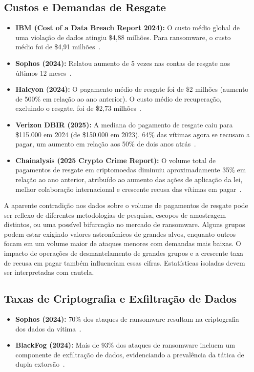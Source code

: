 \subsection{Custos e Demandas de Resgate}
\begin{itemize}
    \item \textbf{IBM (Cost of a Data Breach Report 2024):} O custo médio global de uma violação de dados 
    atingiu \$4,88 milhões. Para ransomware, o custo médio foi de \$4,91 milhões~\cite{}.
    \item \textbf{Sophos (2024):} Relatou aumento de 5 vezes nas contas de resgate nos últimos 12 meses~\cite{SophosStateOfRansomware2024}.
    \item \textbf{Halcyon (2024):} O pagamento médio de resgate foi de \$2 milhões (aumento de 500\% em relação ao ano anterior). O custo médio de recuperação, excluindo o resgate, foi de \$2,73 milhões~\cite{HalcyonFinancialImpactRansomware}.
    \item \textbf{Verizon DBIR (2025):} A mediana do pagamento de resgate caiu para \$115.000 em 2024 (de \$150.000 em 2023). 64\% das vítimas agora se recusam a pagar, um aumento em relação aos 50\% de dois anos atrás~\cite{VerizonDBIR2025}.
    \item \textbf{Chainalysis (2025 Crypto Crime Report):} O volume total de pagamentos de resgate em criptomoedas diminuiu aproximadamente 35\% em relação ao ano anterior, atribuído ao aumento das ações de aplicação da lei, melhor colaboração internacional e crescente recusa das vítimas em pagar~\cite{ChainalysisCryptoCrimeReport2025}.
\end{itemize}

A aparente contradição nos dados sobre o volume de pagamentos de resgate pode ser reflexo de diferentes metodologias de pesquisa, escopos de amostragem distintos, ou uma possível bifurcação no mercado de ransomware. Alguns grupos podem estar exigindo valores astronômicos de grandes alvos, enquanto outros focam em um volume maior de ataques menores com demandas mais baixas. O impacto de operações de desmantelamento de grandes grupos e a crescente taxa de recusa em pagar também influenciam essas cifras. Estatísticas isoladas devem ser interpretadas com cautela.

\subsection{Taxas de Criptografia e Exfiltração de Dados}
\begin{itemize}
    \item \textbf{Sophos (2024):} 70\% dos ataques de ransomware resultam na criptografia dos dados da vítima~\cite{SophosStateOfRansomware2024}.
    \item \textbf{BlackFog (2024):} Mais de 93\% dos ataques de ransomware incluem um componente de exfiltração de dados, evidenciando a prevalência da tática de dupla extorsão~\cite{BlackFog2025StateOfRansomware2024}.
\end{itemize}


